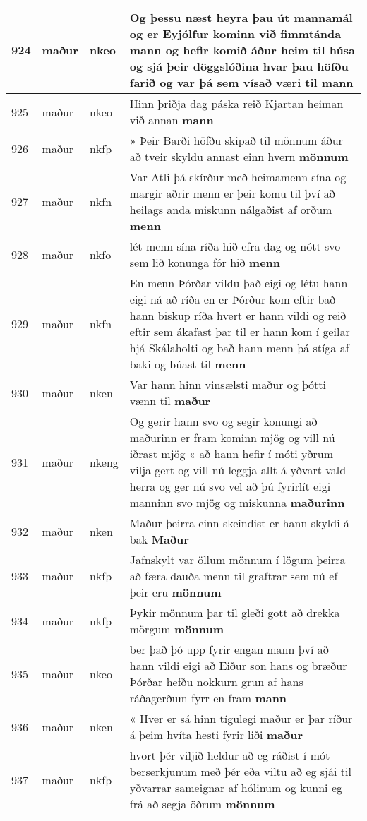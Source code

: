 \documentclass{article}
\begin{document}
\begin{longtable}{p{1cm}|p{1cm}|p{1cm}|p{13cm}}
\hline
924&maður&nkeo&Og þessu næst heyra þau út mannamál og er Eyjólfur kominn við fimmtánda mann og hefir komið áður heim til húsa og sjá þeir döggslóðina hvar þau höfðu farið og var þá sem vísað væri til \textbf{mann} \\
\hline
925&maður&nkeo&Hinn þriðja dag páska reið Kjartan heiman við annan \textbf{mann} \\
\hline
926&maður&nkfþ&» Þeir Barði höfðu skipað til mönnum áður að tveir skyldu annast einn hvern \textbf{mönnum} \\
\hline
927&maður&nkfn&Var Atli þá skírður með heimamenn sína og margir aðrir menn er þeir komu til því að heilags anda miskunn nálgaðist af orðum \textbf{menn} \\
\hline
928&maður&nkfo&lét menn sína ríða hið efra dag og nótt svo sem lið konunga fór hið \textbf{menn} \\
\hline
929&maður&nkfn&En menn Þórðar vildu það eigi og létu hann eigi ná að ríða en er Þórður kom eftir bað hann biskup ríða hvert er hann vildi og reið eftir sem ákafast þar til er hann kom í geilar hjá Skálaholti og bað hann menn þá stíga af baki og búast til \textbf{menn} \\
\hline
930&maður&nken&Var hann hinn vinsælsti maður og þótti vænn til \textbf{maður} \\
\hline
931&maður&nkeng&Og gerir hann svo og segir konungi að maðurinn er fram kominn mjög og vill nú iðrast mjög « að hann hefir í móti yðrum vilja gert og vill nú leggja allt á yðvart vald herra og ger nú svo vel að þú fyrirlít eigi manninn svo mjög og miskunna \textbf{maðurinn} \\
\hline
932&maður&nken&Maður þeirra einn skeindist er hann skyldi á bak \textbf{Maður} \\
\hline
933&maður&nkfþ&Jafnskylt var öllum mönnum í lögum þeirra að færa dauða menn til graftrar sem nú ef þeir eru \textbf{mönnum} \\
\hline
934&maður&nkfþ&Þykir mönnum þar til gleði gott að drekka mörgum \textbf{mönnum} \\
\hline
935&maður&nkeo&ber það þó upp fyrir engan mann því að hann vildi eigi að Eiður son hans og bræður Þórðar hefðu nokkurn grun af hans ráðagerðum fyrr en fram \textbf{mann} \\
\hline
936&maður&nken&« Hver er sá hinn tígulegi maður er þar ríður á þeim hvíta hesti fyrir liði \textbf{maður} \\
\hline
937&maður&nkfþ&hvort þér viljið heldur að eg ráðist í mót berserkjunum með þér eða viltu að eg sjái til yðvarrar sameignar af hólinum og kunni eg frá að segja öðrum \textbf{mönnum} \\

\end{longtable}
\end{document}
